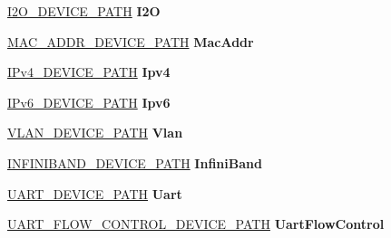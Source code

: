 \begin{DoxyCompactItemize}
\hyperlink{struct_i2_o___d_e_v_i_c_e___p_a_t_h}{I2\+O\+\_\+\+D\+E\+V\+I\+C\+E\+\_\+\+P\+A\+TH} {\bfseries I2O}
\item 
\mbox{\label{union_e_f_i___d_e_v___p_a_t_h_af0f0a4c156b98a52b7148c0c1f41cb1a}} 
\hyperlink{struct_m_a_c___a_d_d_r___d_e_v_i_c_e___p_a_t_h}{M\+A\+C\+\_\+\+A\+D\+D\+R\+\_\+\+D\+E\+V\+I\+C\+E\+\_\+\+P\+A\+TH} {\bfseries Mac\+Addr}
\item 
\mbox{\label{union_e_f_i___d_e_v___p_a_t_h_a4e1fe3fb00b71c21037c4f80c8a0af89}} 
\hyperlink{struct_i_pv4___d_e_v_i_c_e___p_a_t_h}{I\+Pv4\+\_\+\+D\+E\+V\+I\+C\+E\+\_\+\+P\+A\+TH} {\bfseries Ipv4}
\item 
\mbox{\label{union_e_f_i___d_e_v___p_a_t_h_a0e36297fcbd0e3664016957ead4356ae}} 
\hyperlink{struct_i_pv6___d_e_v_i_c_e___p_a_t_h}{I\+Pv6\+\_\+\+D\+E\+V\+I\+C\+E\+\_\+\+P\+A\+TH} {\bfseries Ipv6}
\item 
\mbox{\label{union_e_f_i___d_e_v___p_a_t_h_a8e2e9909b9c46155e8f47751d3e28c5d}} 
\hyperlink{struct_v_l_a_n___d_e_v_i_c_e___p_a_t_h}{V\+L\+A\+N\+\_\+\+D\+E\+V\+I\+C\+E\+\_\+\+P\+A\+TH} {\bfseries Vlan}
\item 
\mbox{\label{union_e_f_i___d_e_v___p_a_t_h_a2cee6a50b80992c3f69421b600f84097}} 
\hyperlink{struct_i_n_f_i_n_i_b_a_n_d___d_e_v_i_c_e___p_a_t_h}{I\+N\+F\+I\+N\+I\+B\+A\+N\+D\+\_\+\+D\+E\+V\+I\+C\+E\+\_\+\+P\+A\+TH} {\bfseries Infini\+Band}
\item 
\mbox{\label{union_e_f_i___d_e_v___p_a_t_h_a887329336d8c2b80f0a66d11b07bd4e5}} 
\hyperlink{struct_u_a_r_t___d_e_v_i_c_e___p_a_t_h}{U\+A\+R\+T\+\_\+\+D\+E\+V\+I\+C\+E\+\_\+\+P\+A\+TH} {\bfseries Uart}
\item 
\mbox{\label{union_e_f_i___d_e_v___p_a_t_h_a9976f35d85e3b946273ee76641688aa9}} 
\hyperlink{struct_u_a_r_t___f_l_o_w___c_o_n_t_r_o_l___d_e_v_i_c_e___p_a_t_h}{U\+A\+R\+T\+\_\+\+F\+L\+O\+W\+\_\+\+C\+O\+N\+T\+R\+O\+L\+\_\+\+D\+E\+V\+I\+C\+E\+\_\+\+P\+A\+TH} {\bfseries Uart\+Flow\+Control}
\item 
\mbox{\label{union_e_f_i___d_e_v___p_a_t_h_ac8b5af83478ba18ead8d4b0cdb8d2392}} 

\end{DoxyCompactItemize}

